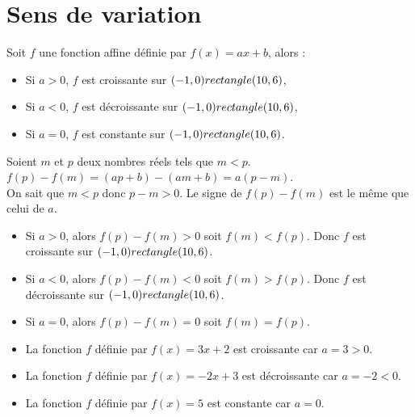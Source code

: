 \section{Sens de variation}

\begin{Propriétés}
Soit $f$ une fonction affine définie par $f(x)=ax+b$, alors :
\begin{itemize}[label=\textcolor{Couleur2}{$\bullet$}]
\item Si $a>0$, $f$ est croissante sur $(-1,0) rectangle (10,6)$,
\item Si $a<0$, $f$ est décroissante sur $(-1,0) rectangle (10,6)$, 
\item Si $a=0$, $f$ est constante sur $(-1,0) rectangle (10,6)$. 
\end{itemize}

\end{Propriétés}

\begin{Remarque}
Soient $m$ et $p$ deux nombres réels tels que $m < p$. $f(p)-f(m) = (ap +b ) - (am + b) = a(p - m)$. \\
On sait que $m < p$ donc $p - m > 0$.
Le signe de $f(p) - f(m)$ est le même que celui de $a$.
\begin{itemize}[label=\textcolor{Couleur7}{$\bullet$}]
\item Si $a>0$, alors $f(p)-f(m)>0$ soit $f(m)<f(p)$.
Donc $f$ est croissante sur $(-1,0) rectangle (10,6)$.
\item Si $a<0$, alors $f(p)-f(m)<0$ soit $f(m)>f(p)$.
Donc $f$ est décroissante sur $(-1,0) rectangle (10,6)$.
\item Si $a=0$, alors $f(p)-f(m)=0$ soit $f(m)=f(p)$.
\end{itemize}
\end{Remarque}

\begin{Exemples}
\leavevmode\vspace{-\baselineskip}
\begin{itemize}[label=\textcolor{Couleur10}{$\bullet$}]
\item La fonction $f$ définie par $f(x)=3x+2$ est croissante car $ a=3>0 $.
\item La fonction $f$ définie par $f(x)=-2x+3$ est décroissante car $ a=-2<0 $.
\item La fonction $f$ définie par $f(x)=5$ est constante car $ a=0 $.
\end{itemize}
\end{Exemples}

\newpage

